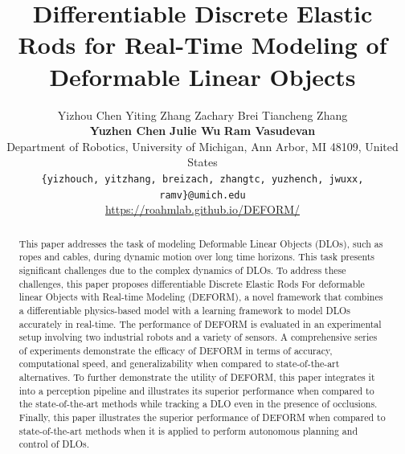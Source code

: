 \documentclass{article}
\title{Differentiable Discrete Elastic Rods for Real-Time Modeling of Deformable Linear Objects}
\author{
    Yizhou Chen\hspace{15pt} Yiting Zhang\hspace{15pt} Zachary Brei\hspace{15pt} Tiancheng Zhang\hspace{15pt} \\ \textbf{Yuzhen Chen}\hspace{15pt}  \textbf{Julie Wu}\hspace{15pt} \textbf{Ram Vasudevan}\\
  Department of Robotics, University of Michigan, Ann Arbor, MI 48109, United States\\
  \texttt{\{yizhouch, yitzhang, breizach, zhangtc, yuzhench, jwuxx, ramv\}@umich.edu}\\
  \url{https://roahmlab.github.io/DEFORM/}
}
\begin{document}
\maketitle


\begin{abstract}
This paper addresses the task of modeling Deformable Linear Objects (DLOs), such as ropes and cables, during dynamic motion over long time horizons.
This task presents significant challenges due to the complex dynamics of DLOs.
To address these challenges, this paper proposes differentiable Discrete Elastic Rods For deformable linear Objects with Real-time Modeling (DEFORM), 
a novel framework that combines a differentiable physics-based model with a learning framework to model DLOs accurately in real-time.
The performance of DEFORM is evaluated in an experimental setup involving two industrial robots and a variety of sensors.
A comprehensive series of experiments demonstrate the efficacy of DEFORM in terms of accuracy, computational speed, and generalizability when compared to state-of-the-art alternatives.
To further demonstrate the utility of DEFORM, this paper integrates it into a perception pipeline and illustrates its superior performance when compared to the state-of-the-art methods while tracking a DLO even in the presence of occlusions. 
Finally, this paper illustrates the superior performance of DEFORM when compared to state-of-the-art methods when it is applied to perform autonomous planning and control of DLOs.
\end{abstract}
\end{document}
